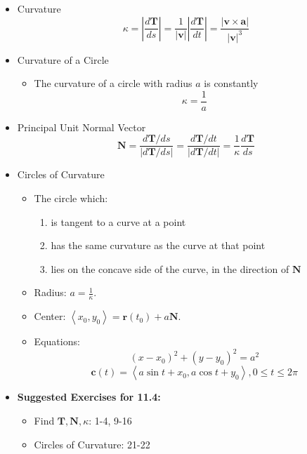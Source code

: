 \documentclass[12pt]{article}
\renewcommand{\vec}[1]{\mathbf{#1}}
\newcommand{\<}{\left<}
\renewcommand{\>}{\right>}
\begin{document}
    \begin{itemize}
      \item Curvature
        \[\kappa = \left|\frac{d\vec{T}}{ds}\right| = \frac{1}{|\vec{v}|}\left|\frac{d\vec{T}}{dt}\right| = \frac{|\vec{v} \times \vec{a}|}{|\vec{v}|^3}\]
      
      \item Curvature of a Circle
      
        \begin{itemize}
        \item The curvature of a circle with radius $a$ is constantly \[\kappa = \frac{1}{a}\]
        \end{itemize}
      
      \item Principal Unit Normal Vector
        \[\vec{N} = \frac{d\vec{T}/ds}{|d\vec{T}/ds|} = \frac{d\vec{T}/dt}{|d\vec{T}/dt|} = \frac{1}{\kappa} \frac{d\vec{T}}{ds}\]
      
      \item Circles of Curvature
      
        \begin{itemize}
        \item The circle which:
          \begin{enumerate}
          \item is tangent to a curve at a point
          \item has the same curvature as the curve at that point
          \item lies on the concave side of the curve, in the direction of $\vec{N}$
          \end{enumerate}
        \item Radius: $a = \displaystyle\frac{1}{\kappa}$.
        \item Center: $\<x_0,y_0\> = \vec{r}(t_0)+a\vec{N}$.
        \item Equations: 
          \[(x-x_0)^2+(y-y_0)^2=a^2\]
          \[\vec{c}(t) = \<a\sin t+x_0,a\cos t+y_0\>, 0\leq t\leq 2\pi\]
        \end{itemize}
        
      \item \textbf{ Suggested Exercises for 11.4:}
      
        \begin{itemize}
        \item Find $\vec{T},\vec{N},\kappa$: 1-4, 9-16
        \item Circles of Curvature: 21-22
        \end{itemize}
      
    \end{itemize}
  
\end{document}
